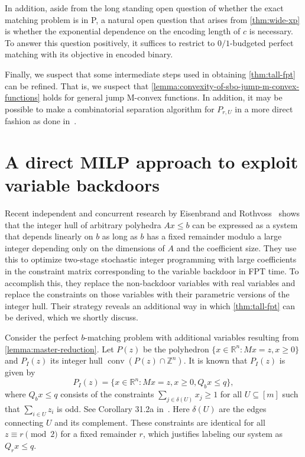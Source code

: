 \documentclass[a4paper,UKenglish,cleveref,thm-restate]{lipics-v2021}
\newcommand{\R}{\mathbb R}
\newcommand{\Z}{\mathbb Z}
\DeclareMathOperator{\conv}{conv}
\begin{document}
In addition, aside from the long standing open question of whether the exact matching problem is in P, a natural open question that arises from \cref{thm:wide-xp} is whether the exponential dependence on the encoding length of $c$ is necessary. To answer this question positively, it suffices to restrict to $0/1$-budgeted perfect matching with its objective in encoded binary\iftoggle{ea}{, see \cref{sec:wide}}{}.

Finally, we suspect that some intermediate steps used in obtaining \cref{thm:tall-fpt} can be refined. That is, we suspect that \cref{lemma:convexity-of-sbo-jump-m-convex-functions} holds for general jump M-convex functions. In addition, it may be possible to make a combinatorial separation algorithm for $P_{r,U}$ in a more direct fashion as done in~\cite{DBLP:journals/mor/Zhang03}. 


\appendix

\section{A direct MILP approach to exploit variable backdoors}
\label{sec:milp-approach-for-tall-fpt}

Recent independent and concurrent research by Eisenbrand and Rothvoss~\cite{eisenbrand2025parameterizedlinearformulationinteger} shows that the integer hull of arbitrary polyhedra $Ax\le b$ can be expressed as a system that depends linearly on $b$ as long as $b$ has a fixed remainder modulo a large integer depending only on the dimensions of $A$ and the coefficient size. They use this to optimize two-stage stochastic integer programming with large coefficients in the constraint matrix corresponding to the variable backdoor in FPT time. To accomplish this, they replace the non-backdoor variables with real variables and replace the constraints on those variables with their parametric versions of the integer hull. Their strategy reveals an additional way in which \cref{thm:tall-fpt} can be derived, which we shortly discuss.

Consider the perfect $b$-matching problem with additional variables resulting from \cref{lemma:master-reduction}. Let $P(z)$ be the polyhedron $\{x\in\R^n:Mx=z,x\ge0\}$ and $P_I(z)$ its integer hull $\conv(P(z)\cap\Z^n)$. It is known that $P_I(z)$ is given by
\[
    P_I(z)=\{x\in\R^n:Mx=z,x\ge0,Q_bx\le q\},
\]
where $Q_bx\le q$ consists of the constraints $\sum_{j\in\delta(U)}x_j\ge1$ for all $U\subseteq[m]$ such that $\sum_{i\in U}z_i$ is odd. See Corollary 31.2a in~\cite{schrijver2003combinatorial}. Here $\delta(U)$ are the edges connecting $U$ and its complement. These constraints are identical for all $z\equiv r\pmod2$ for a fixed remainder $r$, which justifies labeling our system as $Q_rx\le q$.
\end{document}
